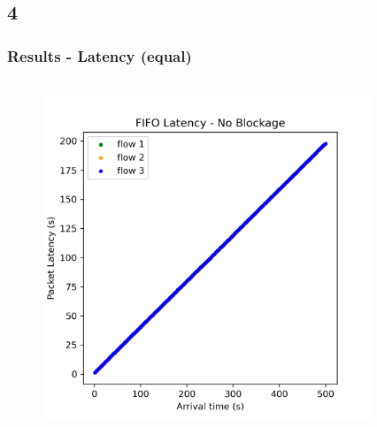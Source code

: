 \documentclass[compress]{beamer}
\begin{document}
    \subsection{4}
    \begin{frame}
        \frametitle{Results - Latency (equal)}
        \begin{columns}
            \begin{column}{0.32\textwidth}
                \begin{figure}
                    \centering
                    \includegraphics[width=\textwidth]{img/fifo_equal}
                \end{figure}
            \end{column}
            \begin{column}{0.32\textwidth}
                \begin{figure}
                    \centering

\end{figure}
\end{column}
\end{columns}
\end{frame}
\end{document}
